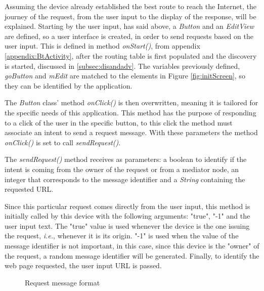 Assuming the device already established the best route to reach the Internet, the journey of the request, from the user input to the display of the response, will be explained. Starting by the user input, has said above, a \textit{Button} and an \textit{EditView} are defined, so a user interface is created, in order to send requests based on the user input. This is defined in method \textit{onStart()}, from appendix \ref{appendix:BtActivity}, after the routing table is first populated and the discovery is started, discussed in \ref{subsec:disandadv}. The variables previously defined, \textit{goButton} and \textit{mEdit} are matched to the elements in Figure \ref{fig:initScreen}, so they can be identified by the application.

The \textit{Button} class' method \textit{onClick()} is then overwritten, meaning it is tailored for the specific needs of this application. This method has the purpose of responding to a click of the user in the specific button, to this click the method must associate an intent to send a request message. With these parameters the method \textit{onClick()} is set to call \textit{sendRequest()}.

The \textit{sendRequest()} method receives as parameters: a boolean to identify if the intent is coming from the owner of the request or from a mediator node, an integer that corresponds to the message identifier and a \textit{String} containing the requested \gls{URL}.

Since this particular request comes directly from the user input, this method is initially called by this device with the following arguments: "true", "-1" and the user input text. The "true" value is used whenever the device is the one issuing the request, \textit{i.e.}, whenever it is its origin. "-1" is used when the value of the message identifier is not important, in this case, since this device is the "owner" of the request, a random message identifier will be generated. Finally, to identify the web page requested, the user input \gls{URL} is passed.

\begin{figure}[ht]
   \noindent{}
	\caption{\label{fig:rqtmsg} Request message format}
\end{figure}

